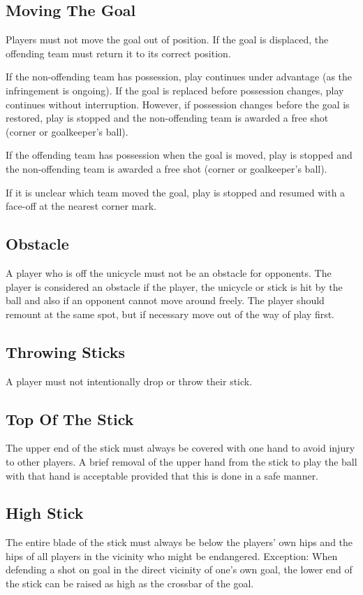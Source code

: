 \subsection{Moving The Goal}
Players must not move the goal out of position.
If the goal is displaced, the offending team must return it to its correct position.

If the non-offending team has possession, play continues under advantage (as the infringement is ongoing).
If the goal is replaced before possession changes, play continues without interruption.
However, if possession changes before the goal is restored, play is stopped and the non-offending team is awarded a free shot (corner or goalkeeper’s ball).

If the offending team has possession when the goal is moved, play is stopped and the non-offending team is awarded a free shot (corner or goalkeeper’s ball).

If it is unclear which team moved the goal, play is stopped and resumed with a face-off at the nearest corner mark.

\subsection{Obstacle}
A player who is off the unicycle must not be an obstacle for opponents.
The player is considered an obstacle if the player, the unicycle or stick is hit by the ball and also if an opponent cannot move around freely.
The player should remount at the same spot, but if necessary move out of the way of play first.

\subsection{Throwing Sticks}
A player must not intentionally drop or throw their stick.

\subsection{Top Of The Stick}
The upper end of the stick must always be covered with one hand to avoid injury to other players.
A brief removal of the upper hand from the stick to play the ball with that hand is acceptable provided that this is done in a safe manner.

\subsection{High Stick}
The entire blade of the stick must always be below the players' own hips and the hips of all players in the vicinity who might be endangered.
Exception: When defending a shot on goal in the direct vicinity of one's own goal, the lower end of the stick can be raised as high as the crossbar of the goal.

